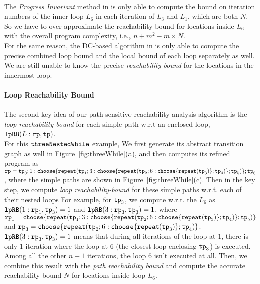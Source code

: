 \\
The \emph{Progress Invariant} method in \cite{GulwaniJK09} is only able to compute
the
bound on iteration numbers
of the inner loop $L_6$ in each iteration of $L_3$ and $L_1$, which are both $N$.
So we have to over-approximate the reachability-bound for locations inside $L_6$ with the
overall program complexity, i.e., $n + m^2 - m \times N$.
\\
For the same reason, the DC-based algorithm in \cite{sinn2017complexity}
is only able to
compute the precise combined loop bound and the local bound of each loop
separately as well.
We are still unable to know the precise \emph{reachability-bound} for the locations in the innermost loop.
\paragraph*{Loop Reachability Bound}
The second key idea of our path-sensitive reachability analysis algorithm is the
\emph{loop reachability-bound} for each simple path w.r.t an enclosed loop,
${\mathtt{lpRB}}(L:{\mathtt{rp}}, {\mathtt{tp}})$.
%
\\
For this ${\mathtt{threeNestedWhile}}$ example, We first generate its abstract transition graph as well in Figure~\ref{fig:threeWhile}(a),
and then computes its refined program as 
$
\rprog = \tpath_0 ; 
1: \rpchoose{\rprepeat(\tpath_1; 3: \rpchoose{\rprepeat(\tpath_2; 6 : \rpchoose{\rprepeat(\tpath_3)}; \tpath_4)}; \tpath_5)}; \tpath_6
$,
where the simple paths are shown in Figure~\ref{fig:threeWhile}(c).
Then in the key step, we compute \emph{loop reachability-bound} for these simple paths w.r.t. each of their nested loops
For example, for ${\mathtt{tp}}_3$, we compute
w.r.t. the $L_6$ as
${\mathtt{lpRB}}(1: {\mathtt{rp}}_1, {\mathtt{tp}}_3) = 1$ and
${\mathtt{lpRB}}(3: {\mathtt{rp}}_3, {\mathtt{tp}}_3) = 1$,
where 
$\rprog_1 = \rpchoose{\rprepeat(\tpath_1; 3: \rpchoose{\rprepeat(\tpath_2; 6 : \rpchoose{\rprepeat(\tpath_3)}; \tpath_4)}; \tpath_5)}$
and
$\rprog_3 = \rpchoose{\rprepeat(\tpath_2; 6 : \rpchoose{\rprepeat(\tpath_3)}; \tpath_4)}$.
${\mathtt{lpRB}}(3: {\mathtt{rp}}_3, {\mathtt{tp}}_3) = 1$
means that during all iterations of the loop at $1$, there is only $1$ iteration where the loop at $6$
(the closest loop enclosing ${\mathtt{tp}}_3$) is executed.
Among all the other $n - 1$ iterations, the loop $6$ isn't executed at all.
Then, we combine this result with the \emph{path reachability bound} and compute
the accurate reachability bound $N$ for locations inside loop $L_6$.

